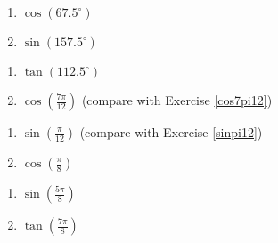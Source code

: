 \begin{multicols}{2}

\begin{enumerate}

\setcounter{enumi}{\value{HW}}

\item  $\cos(67.5^{\circ})$
\item  $\sin(157.5^{\circ})$

\setcounter{HW}{\value{enumi}}

\end{enumerate}

\end{multicols}

\begin{multicols}{2}

\begin{enumerate}

\setcounter{enumi}{\value{HW}}

\item  $\tan(112.5^{\circ})$ 
\item  $\cos\left( \frac{7\pi}{12} \right)$  (compare with Exercise \ref{cos7pi12})

\setcounter{HW}{\value{enumi}}

\end{enumerate}

\end{multicols}

\begin{multicols}{2}

\begin{enumerate}

\setcounter{enumi}{\value{HW}}

\item  $\sin\left( \frac{\pi}{12} \right)$  (compare with Exercise \ref{sinpi12})
\item $\cos \left( \frac{\pi}{8} \right)$

\setcounter{HW}{\value{enumi}}

\end{enumerate}

\end{multicols}

\begin{multicols}{2}

\begin{enumerate}

\setcounter{enumi}{\value{HW}}

\item $\sin \left( \frac{5\pi}{8} \right)$
\item $\tan \left( \frac{7\pi}{8} \right)$ \label{idenhalfanglelast}

\setcounter{HW}{\value{enumi}}

\end{enumerate}

\end{multicols}

